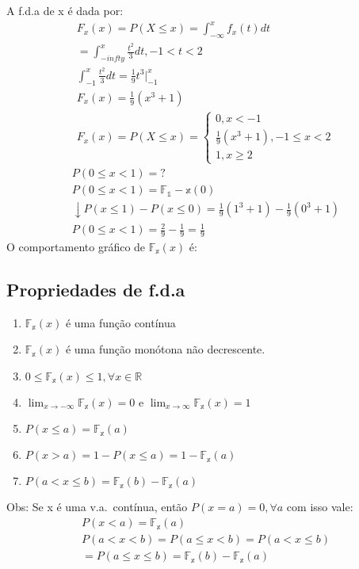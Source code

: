 \documentclass[11pt,a4paper]{book}
\begin{document}
\begin{enumerate}[label=(\alph*)]
\begin{enumerate}
A f.d.a de x é dada por: 
\begin{align*}
  F_{x}(x)= P(X \le x)= \int_{-\infty}^{x} f_{x}(t) dt\\
  = \int_{-infty}^{x} \frac{t^2}{3} dt, -1<t<2 \\
  \int_{-1}^{x} \frac{t^2}{3} dt= \frac{1}{9} t^3 |^x_{-1}\\
  F_{x}(x)= \frac{1}{9}(x^3 +1)\\
  F_{x}(x)=P(X \le x)= 
  \begin{cases}
    0, x <-1 \\
    \frac{1}{9}(x^3 +1) , -1 \le x <2 \\
    1, x \geq 2
  \end{cases}
\end{align*}
\begin{align*}
  P(0 \le x <1)=? \\
  P(0 \le x <1)= \mathbb{F_{1}}- \mathbb{x}(0)\\
  \downarrow 
  P(x \le 1 ) - P(x \le 0)= \frac{1}{9} (1^3 + 1 ) - \frac{1}{9}(0^3+ 1)\\
  P(0 \le x < 1 )= \frac{2}{9} - \frac{1}{9} = \frac{1}{9}
\end{align*}
O comportamento gráfico de $\mathbb{F_{x}}(x)$ é: 
\subsection{Propriedades de f.d.a}
\begin{enumerate}[label=(\alph*)]
  \item $\mathbb{F_{x}}(x)$  é uma função contínua
  \item $\mathbb{F_{x}}(x)$ é uma função monótona não decrescente. 
  \item  $0\le \mathbb{F_{x}}(x)\le 1, \forall x \in \mathbb{R}$
  \item $ \lim_{x \to -\infty} \mathbb{F_{x}}(x)=0$ e $ \lim_{x \to \infty} \mathbb{F_{x}}(x)=1$
  \item $P(x \le a) = \mathbb{F_{x}}(a)$
  \item $P(x>a)=1 - P(x \le a)= 1 - \mathbb{F_{x}}(a)$
  \item $P(a<x\le b)= \mathbb{F_{x}}(b)- \mathbb{F_{x}}(a)$
\end{enumerate}
Obs: Se x é uma v.a.\ contínua, então $P(x=a)=0, \forall a$ com isso vale: 
\begin{align}
  P(x<a)=\mathbb{F_{x}}(a)\\
  P(a<x<b)= P(a \le x < b)= P(a < x \le b)\\
  = P(a \le x \le b)=\mathbb{F_{x}}(b)-\mathbb{F_{x}}(a)
\end{align}


\end{enumerate}
\end{enumerate}
\end{document}
